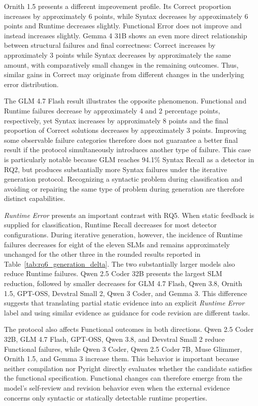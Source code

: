 Ornith 1.5 presents a different improvement profile. Its Correct proportion increases by approximately 6 points, while Syntax decreases by approximately 6 points and Runtime decreases slightly. Functional Error does not improve and instead increases slightly. Gemma 4 31B shows an even more direct relationship between structural failures and final correctness: Correct increases by approximately 3 points while Syntax decreases by approximately the same amount, with comparatively small changes in the remaining outcomes. Thus, similar gains in Correct may originate from different changes in the underlying error distribution.

The GLM 4.7 Flash result illustrates the opposite phenomenon. Functional and Runtime failures decrease by approximately 4 and 2 percentage points, respectively, yet Syntax increases by approximately 8 points and the final proportion of Correct solutions decreases by approximately 3 points. Improving some observable failure categories therefore does not guarantee a better final result if the protocol simultaneously introduces another type of failure. This case is particularly notable because GLM reaches 94.1\% Syntax Recall as a detector in RQ2, but produces substantially more Syntax failures under the iterative generation protocol. Recognizing a syntactic problem during classification and avoiding or repairing the same type of problem during generation are therefore distinct capabilities.

\emph{Runtime Error} presents an important contrast with RQ5. When static feedback is supplied for classification, Runtime Recall decreases for most detector configurations. During iterative generation, however, the incidence of Runtime failures decreases for eight of the eleven SLMs and remains approximately unchanged for the other three in the rounded results reported in Table~\ref{tab:rq6_generation_delta}. The two substantially larger models also reduce Runtime failures. Qwen 2.5 Coder 32B presents the largest SLM reduction, followed by smaller decreases for GLM 4.7 Flash, Qwen 3.8, Ornith 1.5, GPT-OSS, Devstral Small 2, Qwen 3 Coder, and Gemma 3. This difference suggests that translating partial static evidence into an explicit \emph{Runtime Error} label and using similar evidence as guidance for code revision are different tasks.

The protocol also affects Functional outcomes in both directions. Qwen 2.5 Coder 32B, GLM 4.7 Flash, GPT-OSS, Qwen 3.8, and Devstral Small 2 reduce Functional failures, while Qwen 3 Coder, Qwen 2.5 Coder 7B, Muse Glimmer, Ornith 1.5, and Gemma 3 increase them. This behavior is important because neither compilation nor Pyright directly evaluates whether the candidate satisfies the functional specification. Functional changes can therefore emerge from the model's self-review and revision behavior even when the external evidence concerns only syntactic or statically detectable runtime properties.


